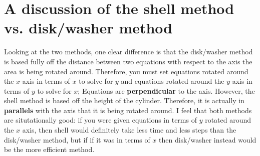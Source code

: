 \documentclass[letterpaper, 12pt]{article}
\begin{document}
\section{A discussion of the shell method vs. disk/washer method}
Looking at the two methods, one clear difference is that the disk/washer method is based fully off the distance between two equations with respect to the axis the area is being rotated around. Therefore, you must set equations rotated around the $x$-axis in terms of $x$ to solve for $y$ and equations rotated around the $y$-axis in terms of $y$ to solve for $x$; Equations are \textbf{perpendicular} to the axis. However, the shell method is based off the height of the cylinder. Therefore, it is actually in \textbf{parallels} with the axis that it is being rotated around. I feel that both methods are situtationally good: if you were given equations in terms of $y$ rotated around the $x$ axis, then shell would definitely take less time and less steps than the disk/washer method, but if if it was in terms of $x$ then disk/washer instead would be the more efficient method.
\end{document}
